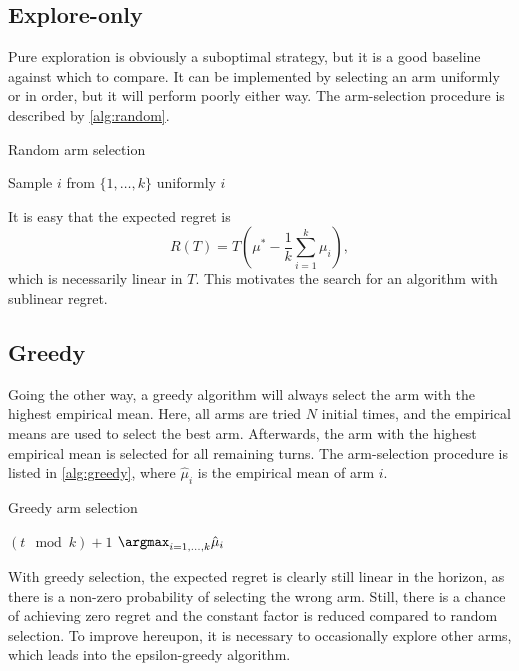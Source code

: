 \subsection{Explore-only}
Pure exploration is obviously a suboptimal strategy, but it is a good baseline against which to compare.
It can be implemented by selecting an arm uniformly or in order, but it will perform poorly either way.
The arm-selection procedure is described by \cref{alg:random}.
\begin{algorithm}
    \caption{Random arm selection}
    \label{alg:random}
    \begin{algorithmic}
        \State Sample $i$ from $\{1,\dots, k\}$ uniformly
        \State \Return $i$
    \end{algorithmic}
\end{algorithm}

It is easy that the expected regret is
\begin{equation}
    R(T) = T\left(\mu^* - \frac{1}{k}\sum_{i=1}^k \mu_i\right),
\end{equation}
which is necessarily linear in $T$.
This motivates the search for an algorithm with sublinear regret.

\subsection{Greedy}
Going the other way, a greedy algorithm will always select the arm with the highest empirical mean.
Here, all arms are tried $N$ initial times, and the empirical means are used to select the best arm.
Afterwards, the arm with the highest empirical mean is selected for all remaining turns.
The arm-selection procedure is listed in \cref{alg:greedy}, where $\hat{\mu}_i$ is the empirical mean of arm $i$.
\begin{algorithm}
    \caption{Greedy arm selection}
    \label{alg:greedy}
    \begin{algorithmic}
        \State \Return $(t \mod k) + 1$
        \Else
        \State \Return $\argmax_{i=1,\dots,k} \hat{\mu}_i$
        \EndIf
    \end{algorithmic}
\end{algorithm}

With greedy selection, the expected regret is clearly still linear in the horizon, as there is a non-zero probability of selecting the wrong arm.
Still, there is a chance of achieving zero regret and the constant factor is reduced compared to random selection.
To improve hereupon, it is necessary to occasionally explore other arms, which leads into the epsilon-greedy algorithm.


